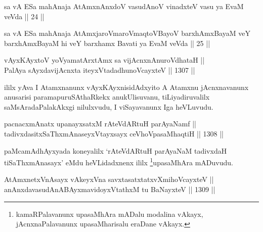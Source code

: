 
\begin{shl}
sa vA ESa mahAnaja AtAmxnAnxdoV vasudAnoV vinadxteV vasu ya EvaM veVda || 24 ||
\end{shl}

\begin{shl}
sa vA ESa mahAnaja AtAmxjaroV\s maroV\s maqtoV\s BayoV barxhAmxBayaM veY barxhAmxBayaM hi veY barxhamx Bavati ya EvaM veVda || 25 ||
\end{shl}

\begin{shl}
vAyxKAyxtoV yoV\s yamatArx\s \s tAmx sa vijAcnxnAnuroVdhataH || \\
PalAya sAyxdavijAcnxta iteyxVtadadhunoVcayxteV \hfill || 1307 ||  
\end{shl}

\begin{artha}
ililx yAva I Atamxnanunx vAyxKAyxnisidAdxyito A Atamxnu jAcnxnavanunx anusarisi paramapuruSAthaRkekx anukUlisuvanu, tiLiyadiruvalilx saMsAradaPalakAkxgi nilulxvudu, I viSayavanunx Iga heVLuvudu.
\end{artha}


\begin{shl}
pacnacxmAnatx upanayxsatxM rAteVdARtuH parAyaNamf || \\
tadivxdasitxSaThxmAnaseyxVtayxsayx ceVhoVpasaMhaqtiH \hfill || 1308 ||  
\end{shl}

\begin{artha}
paMcamAdhAyxyada koneyalilx `rAteVdARtuH parAyaNaM tadivxdaH tiSaThxmAnasayx' eMdu heVLidadxnenx ililx \footnote{kamaRPalavanunx upasaMhAra mADalu modalina vAkayx, jAcnxnaPalavanunx upasaMharisalu eraDane vAkayx.}upasaMhAra mADuvudu.
\end{artha}


\begin{shl}
AtAmxnetxVnAsayx vAkeyxVna savxtasatxtatxvXmihoVcayxteV || \\
anAnxdavasudAnABAyxmavidoyxVtathxM tu BaNayxteV \hfill || 1309 ||  
\end{shl}

